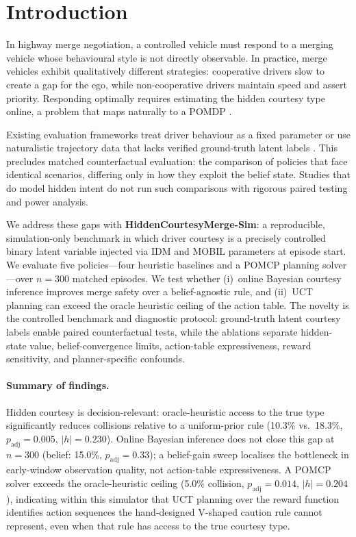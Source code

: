\section{Introduction}
\label{sec:intro}

In highway merge negotiation, a controlled vehicle must respond to a
merging vehicle whose behavioural style is not directly observable.
In practice, merge vehicles exhibit qualitatively different strategies:
cooperative drivers slow to create a gap for the ego, while non-cooperative
drivers maintain speed and assert priority.
Responding optimally requires estimating the hidden courtesy type online, a
problem that maps naturally to a POMDP
\citep{kaelbling1998planning,kochenderfer2022algorithms}.

Existing evaluation frameworks treat driver behaviour as a fixed parameter or
use naturalistic trajectory data that lacks verified ground-truth latent
labels \citep{leurent_highway_env,lopez2018microscopic}.
This precludes matched counterfactual evaluation: the comparison of policies
that face identical scenarios, differing only in how they exploit the belief
state.
Studies that do model hidden intent
\citep{sunberg2020internalstates,kruse2022uncertainty} do not run such
comparisons with rigorous paired testing and power analysis.

We address these gaps with \textbf{HiddenCourtesyMerge-Sim}: a reproducible,
simulation-only benchmark in which driver courtesy is a precisely controlled
binary latent variable injected via IDM \citep{treiber2000congested} and
MOBIL \citep{kesting2007mobil} parameters at episode start.
We evaluate five policies---four heuristic baselines and a POMCP planning
solver---over $n{=}300$ matched episodes.
We test whether (i)~online Bayesian courtesy inference improves merge safety
over a belief-agnostic rule, and (ii)~UCT planning can exceed the oracle
heuristic ceiling of the action table.
The novelty is the controlled benchmark and diagnostic protocol: ground-truth
latent courtesy labels enable paired counterfactual tests, while the ablations
separate hidden-state value, belief-convergence limits, action-table
expressiveness, reward sensitivity, and planner-specific confounds.

\paragraph{Summary of findings.}
Hidden courtesy is decision-relevant: oracle-heuristic access to the true type
significantly reduces collisions relative to a uniform-prior rule
(10.3\% vs.\ 18.3\%, $p_\text{adj}{=}0.005$, $|h|{=}0.230$).
Online Bayesian inference does not close this gap at $n{=}300$
(belief: 15.0\%, $p_\text{adj}{=}0.33$); a belief-gain sweep localises the
bottleneck in early-window observation quality, not action-table
expressiveness.
A POMCP solver exceeds the oracle-heuristic ceiling (5.0\% collision,
$p_\text{adj}{=}0.014$, $|h|{=}0.204$), indicating within this simulator
that UCT planning over the reward function identifies action sequences the
hand-designed V-shaped caution rule cannot represent, even when that rule has
access to the true courtesy type.

